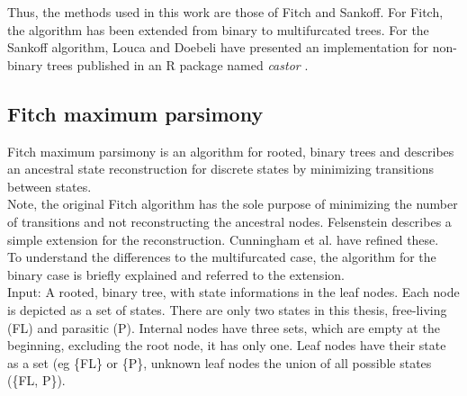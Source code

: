     Thus, the methods used in this work are those of Fitch and Sankoff. For Fitch, the algorithm has 
      been extended from binary to multifurcated trees. For the Sankoff algorithm, Louca and Doebeli 
      have presented an implementation for non-binary trees published in an R package named 
      \textit{castor} \cite{Louca2017}.

    \subsection{Fitch maximum parsimony}
      Fitch maximum parsimony is an algorithm for rooted, binary trees and describes an ancestral state 
        reconstruction for discrete states \cite{Fitch1971} by minimizing transitions between states. \\
      Note, the original Fitch algorithm has the sole purpose of minimizing the number of transitions 
        and not reconstructing the ancestral nodes. Felsenstein \cite{Felsenstein2003} describes a 
        simple extension for the reconstruction. Cunningham et al. \cite{Cunningham1998} have refined 
        these.   \\
      To understand the differences to the multifurcated case, the algorithm for the binary case is 
        briefly explained and referred to the extension. \\

      Input: A rooted, binary tree, with state informations in the leaf nodes. Each node is depicted as 
        a set of states. There are only two states in this thesis, free-living (FL) and parasitic (P). 
        Internal nodes have three sets, which are empty at the beginning, excluding the root node, it 
        has only one. Leaf nodes have their state as a set (eg \{FL\} or \{P\}, unknown leaf nodes the 
        union of all possible states (\{FL, P\}). \\

